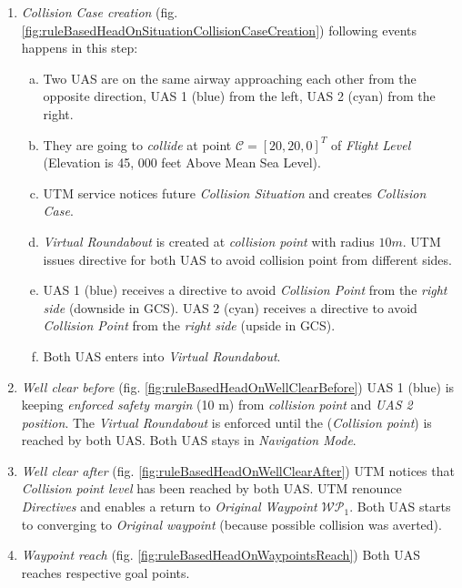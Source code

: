 \begin{enumerate}
    \item\emph{Collision Case creation} (fig. \ref{fig:ruleBasedHeadOnSituationCollisionCaseCreation}) following events happens in this step:
    \begin{enumerate}[a.]
        \item Two UAS are on the same airway approaching each other from the opposite direction, UAS 1 (blue) from the left, UAS 2 (cyan) from the right.
        
        \item They are going to \emph{collide} at point $\mathscr{C}=[20,20,0]^T$ of \emph{Flight Level} (Elevation is 45, 000 feet Above Mean Sea Level).
        
        \item UTM service notices future \emph{Collision Situation} and creates \emph{Collision Case}.
        
        \item \emph{Virtual Roundabout} is created at \emph{collision point} with radius $10 m$. UTM issues directive for both UAS to avoid collision point from different sides.
        
        \item UAS 1 (blue) receives a directive to avoid \emph{Collision Point} from the \emph{right side} (downside in GCS). UAS 2 (cyan) receives a directive to avoid \emph{Collision Point} from the \emph{right side} (upside in GCS).

        \item Both UAS enters into \emph{Virtual Roundabout}.
    \end{enumerate}
    
    \item\emph{Well clear before} (fig. \ref{fig:ruleBasedHeadOnWellClearBefore}) UAS 1 (blue) is keeping \emph{enforced safety margin} (10 m) from \emph{collision point} and \emph{UAS 2 position}. The \emph{Virtual Roundabout} is enforced until the (\emph{Collision point}) is reached by both UAS. Both UAS stays in \emph{Navigation Mode}.
    
    \item\emph{Well clear after} (fig. \ref{fig:ruleBasedHeadOnWellClearAfter}) UTM notices that \emph{Collision point level} has been reached by both UAS. UTM renounce \emph{Directives} and enables a return to \emph{Original Waypoint} $\mathscr{WP}_1$. Both UAS starts to converging to \emph{Original waypoint} (because possible collision was averted).
    
    \item\emph{Waypoint reach} (fig. \ref{fig:ruleBasedHeadOnWaypointsReach}) Both UAS reaches respective goal points.
\end{enumerate}


